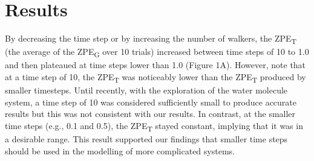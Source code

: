 \documentclass[journal=jacsat,manuscript=article]{achemso}
\begin{document}
\section{Results}

By decreasing the time step or by increasing the number of walkers, the ZPE\textsubscript{T} (the average of the ZPE\textsubscript{G} over 10 trials) increased between time steps of 10 to 1.0 and then plateaued at time steps lower than 1.0 (Figure 1A). However, note that at a time step of 10, the ZPE\textsubscript{T} was noticeably lower than the ZPE\textsubscript{T} produced by smaller timesteps. Until recently, with the exploration of the water molecule system, a time step of 10 was considered sufficiently small to produce accurate results but this was not consistent with our results. In contrast, at the smaller time steps (e.g., 0.1 and 0.5), the ZPE\textsubscript{T} stayed constant, implying that it was in a desirable range. This result supported our findings that smaller time steps should be used in the modelling of more complicated systems. 
\end{document}
